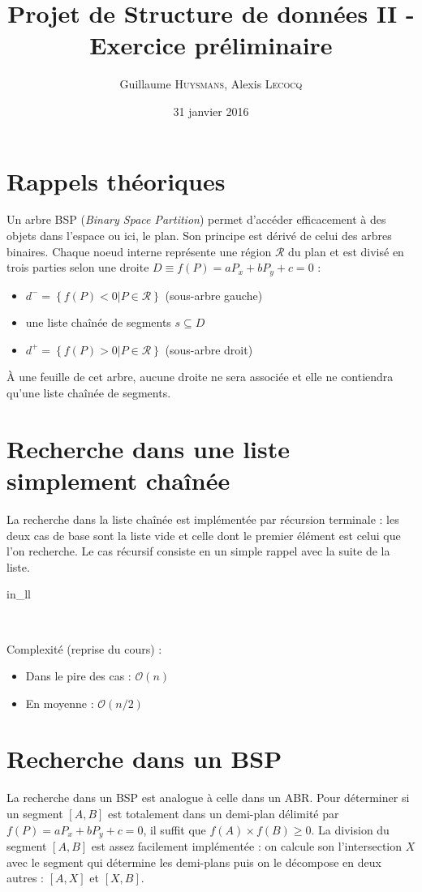 \documentclass[12pt,twocolumn]{article}
\title{Projet de Structure de données II - Exercice préliminaire}
\author{Guillaume \textsc{Huysmans}, Alexis \textsc{Lecocq}}
\date{31 janvier 2016}
\newcommand{\es}{\emptyset}
\newcommand{\inc}{\subseteq}
\newcommand{\bigO}{\mathcal{O}}
\newcommand{\reg}{\mathcal{R}}
\begin{document}
\maketitle

\section{Rappels théoriques}
Un arbre BSP (\textit{Binary Space Partition}) permet d'accéder efficacement
à des objets dans l'espace ou ici, le plan. Son principe est dérivé de celui
des arbres binaires. Chaque noeud interne représente une région $\reg$
du plan et est divisé en trois parties selon
une droite $D\equiv f(P)=aP_x+bP_y+c=0$ :
\begin{itemize}
	\item $d^-=\left\{f(P)<0|P\in\reg\right\}$ (sous-arbre gauche)
	\item une liste chaînée de segments $s \inc D$
	\item $d^+=\left\{f(P)>0|P\in\reg\right\}$ (sous-arbre droit)
\end{itemize}
À une feuille de cet arbre, aucune droite ne sera associée et elle ne
contiendra qu'une liste chaînée de segments.

\section{Recherche dans une liste simplement chaînée}
La recherche dans la liste chaînée est implémentée par récursion terminale :
les deux cas de base sont la liste vide et celle dont le premier élément
est celui que l'on recherche. Le cas récursif consiste en un simple rappel
avec la suite de la liste.

\begin{algorithm}
\caption{in\_ll}
\SetAlgoLined\DontPrintSemicolon
{}
\uIf{ll = $\es$} {
}
 {
}
~
\end{algorithm}

Complexité (reprise du cours) :
\begin{itemize}
	\item Dans le pire des cas : $\bigO(n)$
	\item En moyenne : $\bigO(n/2)$
\end{itemize}

\section{Recherche dans un BSP}
La recherche dans un BSP est analogue à celle dans un ABR.
Pour déterminer si un segment $[A,B]$ est totalement dans un demi-plan
délimité par $f(P)=aP_x+bP_y+c=0$, il suffit que $f(A) \times f(B) \geq 0$.
La division du segment $[A,B]$ est assez facilement implémentée :
on calcule son l'intersection $X$ avec le segment qui détermine
les demi-plans puis on le décompose en deux autres : $[A,X]$ et $[X,B]$.
\end{document}
